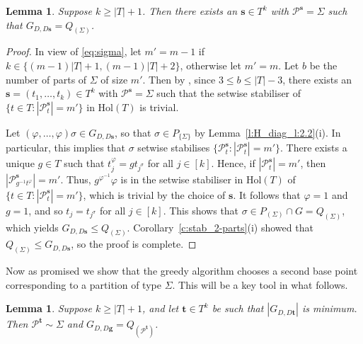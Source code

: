 \documentclass[twoside,a4paper,reqno,11pt]{amsart}
\newcommand{\<}{\langle}
\renewcommand{\>}{\rangle}
\newcommand{\leqs}{\leqslant}
\newcommand{\geqs}{\geqslant}
\newcommand{\Hol}{\mathrm{Hol}}
\newtheorem{lem}[thm]{Lemma}
\theoremstyle{definition}
\begin{document}
\begin{lem}
	\label{l:two_stab_sigma}
	Suppose $k\geqs |T|+1$. Then there exists an $\mathbf{s}\in T^k$ with $\mathcal{P}^{\mathbf{s}} = \Sigma$ such that $G_{D,D\mathbf{s}} = Q_{(\Sigma)}$.
\end{lem}

\begin{proof}
	In view of \eqref{eq:sigma}, let $m' = m-1$ if $k \in \{(m-1)|T|+1, (m-1)|T|+2\}$, otherwise let $m' = m$. Let $b$ be the number of parts of $\Sigma$ of size $m'$.  Then by \cite[Theorem 4]{H_diag}, since $3\leqs b\leqs |T|-3$, there exists an $\mathbf{s} = (t_1,\dots,t_k)\in T^k$ with $\mathcal{P}^{\mathbf{s}} = \Sigma$ such that the setwise stabiliser of $\{t \in T :|\mathcal{P}_t^{\mathbf{s}}| = m'\}$ in $\Hol(T)$ is trivial. %
	
	Let $(\varphi,\dots,\varphi)\sigma\in G_{D,D\mathbf{s}}$, so that $\sigma\in P_{\{\Sigma\}}$ by Lemma~\ref{l:H_diag_l:2.2}(i). In particular, this implies that $\sigma$ setwise stabilises %
    $\{\mathcal{P}_t^{\mathbf{s}} : |\mathcal{P}_t^{\mathbf{s}}| = m'\}$. 
    There exists a unique $g\in T$ such that $t_j^\varphi = gt_{j^\sigma}$ for all $j\in [k]$. Hence, if $|\mathcal{P}_t^{\mathbf{s}}| = m'$, then $|\mathcal{P}_{g^{-1}t^\varphi}^{\mathbf{s}}| = m'$. Thus, $g^{\varphi^{-1}}\varphi$ is in the setwise stabiliser in $\Hol(T)$ of $\{t \in T :|\mathcal{P}_t^{\mathbf{s}}| = m'\}$, which is trivial by the choice of $\mathbf{s}$. It follows that $\varphi = 1$ and $g = 1$, and so $t_j = t_{j^\sigma}$ for all $j\in [k]$. This shows that $\sigma\in P_{(\Sigma)}\cap G = Q_{(\Sigma)}$, which yields $G_{D,D\mathbf{s}}\leqs Q_{(\Sigma)}$. Corollary~\ref{c:stab_2-parts}(i) showed that $Q_{(\Sigma)}\leqs G_{D,D\mathbf{s}}$, so the proof is complete. 
\end{proof}

 Now as promised we show that the greedy algorithm chooses a second base point corresponding to a partition of type $\Sigma$. This will be a key tool in what follows. 
 
\begin{lem}
	\label{l:greedy_two_stab}
	Suppose $k\geqs |T|+1$, and let $\mathbf{t}\in T^k$ be such that $|G_{D,D\mathbf{t}}|$ is minimum. Then $\mathcal{P}^{\mathbf{t}}\sim\Sigma$ and $G_{D,D\mathbf{g}} = Q_{(\mathcal{P}^{\mathbf{t}})}$. 
\end{lem}
\end{document}
